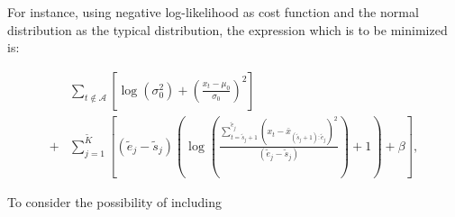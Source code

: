 \documentclass[a4paper, 12pt]{article}
\begin{document}
For instance, using negative log-likelihood as cost function and the normal
distribution as the typical distribution, the expression which is to be
minimized is:


\begin{align*}
&\sum_{t \not\in \mathcal{A}} 
\left[ \log(\sigma_0^2) + \left( \frac{x_t - \mu_0}{\sigma_0} \right)^2 \right] 
 \\ 
+&\sum_{j=1}^{\tilde{K}} \left[ (\tilde{e}_j - \tilde{s}_j) 
\left( \log \left( \frac{ \sum_{t = \tilde{s}_j + 1}^{\tilde{e}_j} (x_t - \bar{x}_{(\tilde{s}_j + 1):\tilde{e}_j})^2 }{(\tilde{e}_j - \tilde{s}_j)} \right) + 1 \right) + \beta \right],
\end{align*}

To consider the possibility of including 
\end{document}
